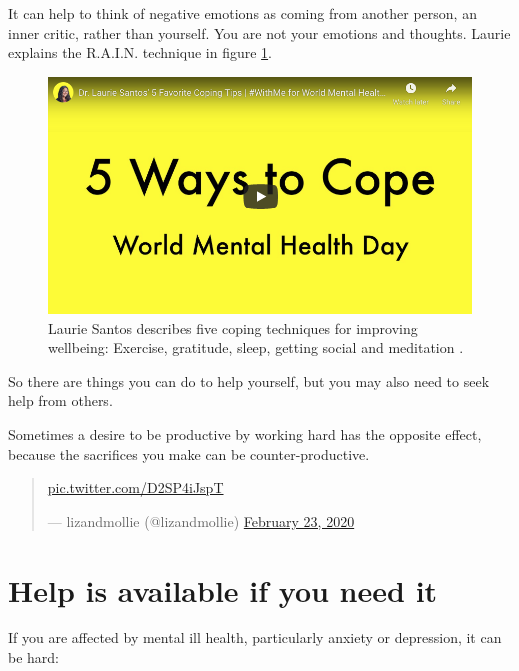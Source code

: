 \documentclass[
]{book}
\begin{document}
It can help to think of negative emotions as coming from another person, an inner critic, rather than yourself. You are not your emotions and thoughts. Laurie explains the R.A.I.N. technique in figure \ref{fig:laurie-fig}.

\begin{figure}

{\centering \includegraphics[width=0.99\linewidth]{images/youtube-santos} 

}

\caption{Laurie Santos describes five coping techniques for improving wellbeing: Exercise, gratitude, sleep, getting social and meditation \citep{youtube-santos}.}\label{fig:laurie-fig}
\end{figure}



So there are things you can do to help yourself, but you may also need to seek help from others.

Sometimes a desire to be productive by working hard has the opposite effect, because the sacrifices you make can be counter-productive.

\begin{quote}
\href{https://t.co/D2SP4iJspT}{pic.twitter.com/D2SP4iJspT}

--- lizandmollie (@lizandmollie) \href{https://twitter.com/lizandmollie/status/1231605700960432128}{February 23,
2020}
\end{quote}

\hypertarget{notalone}{%
\section{Help is available if you need it}\label{notalone}}

If you are affected by mental ill health, particularly anxiety or depression, it can be hard:
\end{document}
